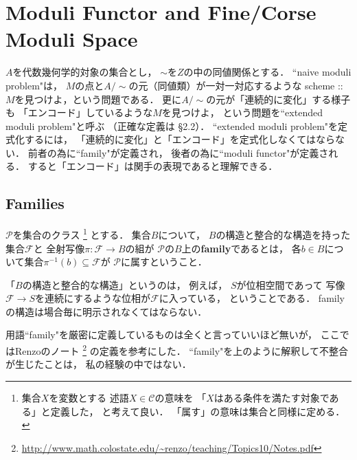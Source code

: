 \documentclass[a4paper]{jsarticle}
\newcommand{\famF}{\mathcal{F}}
\begin{document}
\section{Moduli Functor and Fine/Corse Moduli Space}
    $A$を代数幾何学的対象の集合とし，
    $\sim$を$Z$の中の同値関係とする．
    ``naive moduli problem"は，
    $M$の点と$A/\sim$の元（同値類）が一対一対応するような
    scheme :: $M$を見つけよ，という問題である．
    更に$A/\sim$の元が「連続的に変化」する様子も
    「エンコード」しているような$M$を見つけよ，
    という問題を``extended moduli problem"と呼ぶ
    （正確な定義は\cite{Hos} \S 2.2）．
    ``extended moduli problem"を定式化するには，
    「連続的に変化」と「エンコード」を定式化しなくてはならない．
    前者の為に``family"が定義され，
    後者の為に``moduli functor"が定義される．
    すると「エンコード」は関手の表現であると理解できる．

    \subsection{Families}
    \begin{Def}
        $\mathcal{P}$を集合のクラス
        \footnote
        {
            集合$X$を変数とする
            述語$X \in \mathcal{C}$の意味を
            「$X$はある条件を満たす対象である」と定義した，
            と考えて良い．
            「属す」の意味は集合と同様に定める．
        }
        とする．
        集合$B$について，
        $B$の構造と整合的な構造を持った集合$\famF$と
        全射写像$\pi: \famF \to B$の組が
        $\mathcal{P}$の$B$上の\textbf{family}であるとは，
        各$b \in B$について集合$\pi^{-1}(b) \subseteq \famF$が
        $\mathcal{P}$に属すということ．
    \end{Def}
    「$B$の構造と整合的な構造」というのは，
    例えば，
    $S$が位相空間であって
    写像$\famF \to S$を連続にするような位相が$\famF$に入っている，
    ということである．
    familyの構造は場合毎に明示されなくてはならない．

    用語``family"を厳密に定義しているものは全くと言っていいほど無いが，
    ここではRenzoのノート
    \footnote{ \url{http://www.math.colostate.edu/~renzo/teaching/Topics10/Notes.pdf} }
    の定義を参考にした．
    ``family"を上のように解釈して不整合が生じたことは，
    私の経験の中ではない．
\end{document}
